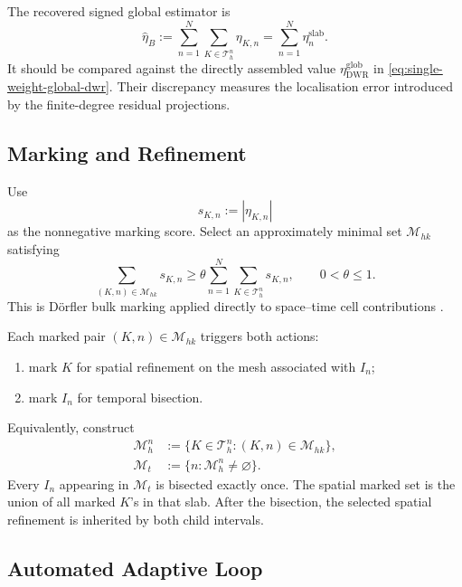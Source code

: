 \documentclass[11pt,a4paper]{article}
\begin{document}
The recovered signed global estimator is
\begin{equation}
 \widehat\eta_B
 :=
 \sum_{n=1}^N\sum_{K\in\mathcal T_h^n}\eta_{K,n}
 =
 \sum_{n=1}^N\eta_n^{\mathrm{slab}}.
 \label{eq:single-recovered-global-estimator}
\end{equation}
It should be compared against the directly assembled value \(\eta_{\mathrm{DWR}}^{\mathrm{glob}}\) in \cref{eq:single-weight-global-dwr}. Their discrepancy measures the localisation error introduced by the finite-degree residual projections.


\subsection{Marking and Refinement}
\label{sec:joint-space-time-marking}

Use
\begin{equation}
 s_{K,n}:=|\eta_{K,n}|
 \label{eq:single-cell-marking-score}
\end{equation}
as the nonnegative marking score. Select an approximately minimal set
\(\mathcal M_{hk}\) satisfying
\begin{equation}
 \sum_{(K,n)\in\mathcal M_{hk}}s_{K,n}
 \ge
 \theta\sum_{n=1}^N\sum_{K\in\mathcal T_h^n}s_{K,n},
 \qquad 0<\theta\le1.
 \label{eq:space-time-dorfler}
\end{equation}
This is D\"orfler bulk marking applied directly to space--time cell contributions \cite{Doerfler1996}.

Each marked pair \((K,n)\in\mathcal M_{hk}\) triggers both actions:
\begin{enumerate}[leftmargin=*]
 \item mark \(K\) for spatial refinement on the mesh associated with \(I_n\);
 \item mark \(I_n\) for temporal bisection.
\end{enumerate}
Equivalently, construct
\begin{align}
 \mathcal M_h^n
 &:=
 \{K\in\mathcal T_h^n:(K,n)\in\mathcal M_{hk}\},
 \label{eq:spatial-mark-projection}\\
 \mathcal M_t
 &:=
 \{n:\mathcal M_h^n\neq\varnothing\}.
 \label{eq:temporal-mark-projection}
\end{align}
Every \(I_n\) appearing in \(\mathcal M_t\) is bisected exactly once. The spatial marked set is the union of all marked \(K\)'s in that slab. After the bisection, the selected spatial refinement is inherited by both child intervals.


\subsection{Automated Adaptive Loop}
\label{sec:single-indicator-loop}
\end{document}
